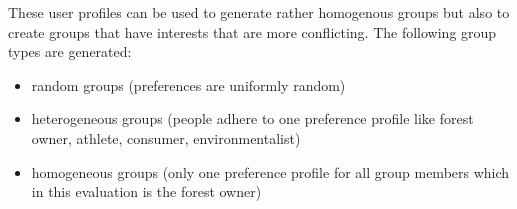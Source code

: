 These user profiles can be used to generate rather homogenous groups but also to create groups that have interests that are more conflicting. The following group types are generated: 

\begin{itemize}
    \item random groups (preferences are uniformly random)
    \item heterogeneous groups (people adhere to one preference profile like forest owner, athlete, consumer, environmentalist)
    \item homogeneous groups (only one preference profile for all group members which in this evaluation is the forest owner)
\end{itemize}

